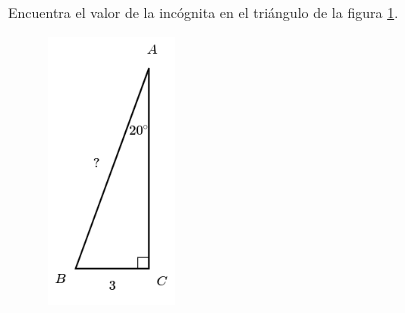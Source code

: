 \question[15]  Encuentra el valor de la incógnita en el triángulo de la figura \ref{fig:lados_functrig_09}.
\begin{figure}[H]
    \begin{center}
        \includegraphics[width=0.3\textwidth]{../images/lados_functrig_09.png}
    \end{center}
    \caption{}
    \label{fig:lados_functrig_09}
\end{figure}